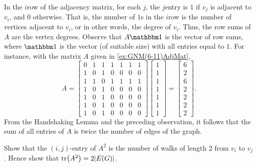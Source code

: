 In the $i$\nth row of the adjacency matrix, for each $j$, the $j$\nth entry is $1$ if $v_j$ is adjacent to $v_i$, and $0$ otherwise. That is, the number of $1$s in the $i$\nth row is the number of vertices adjacent to $v_i$, or in other words, the degree of $v_i$. Thus, the row sums of $A$ are the vertex degrees. Observe that $A \mathbbm 1$ is the vector of row sums, where $\mathbbm 1$ is the vector (of suitable size) with all entries equal to $1$. For instance, with the matrix $A$ given in \cref{ex:GNM(6-11)AdjMat},
\begin{equation*}
A = \begin{bmatrix}
0 & 1 & 1 & 1 & 1 & 1 & 1 \\
1 & 0 & 1 & 0 & 0 & 0 & 0 \\
1 & 1 & 0 & 1 & 1 & 1 & 1 \\
1 & 0 & 1 & 0 & 0 & 0 & 0 \\
1 & 0 & 1 & 0 & 0 & 0 & 0 \\
1 & 0 & 1 & 0 & 0 & 0 & 0 \\
1 & 0 & 1 & 0 & 0 & 0 & 0
\end{bmatrix}
\begin{bmatrix}
1 \\ 1 \\ 1 \\ 1 \\ 1 \\ 1 \\ 1
\end{bmatrix} =
\begin{bmatrix}
6 \\ 2 \\ 6 \\ 2 \\ 2 \\ 2 \\ 2
\end{bmatrix}.
\end{equation*}
From the Handshaking Lemma and the preceding observation, it follows that the sum of all entries of $A$ is twice the number of edges of the graph.

\begin{Exercise}\label{exer:A2ij}
Show that the $(i,j)$-entry of $A^2$ is the number of walks of length $2$ from $v_i$ to $v_j$. Hence show that $\tr(A^2) = 2|E(G)|$.\\
\end{Exercise}

